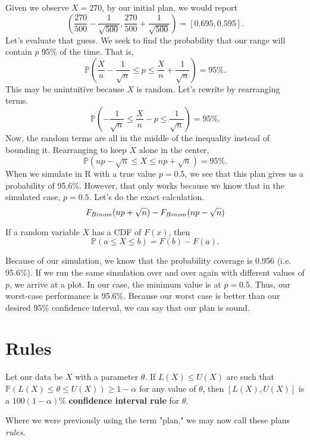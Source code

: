 \documentclass[titlepage, 12pt, leqno]{article}
\begin{document}
Given we observe $X=270$, by our initial plan, we would report
\[
\left(\frac{270}{500}-\frac{1}{\sqrt{500}}, \frac{270}{500} +
\frac{1}{\sqrt{500}}\right) = [0.695,0.595].
\]
Let's evaluate that guess. We seek to find the probability that our range will
contain $p$ 95\% of the time. That is,
\[
\mathbb{P}\left(
\frac{X}{n}-\frac{1}{\sqrt{n}} \le p \le \frac{X}{n} + \frac{1}{\sqrt{n}}
\right) = 95\%.
\]
This may be unintuitive because $X$ is random. Let's rewrite by rearranging
terms.
\[
\mathbb{P}\left(-\frac{1}{\sqrt{n}}\le \frac{X}{n}-p \le \frac{1}{\sqrt{n}}
    \right) = 95\%.
\]
Now, the random terms are all in the middle of the inequality instead of
bounding it. Rearranging to keep $X$ alone in the center,
\[
    \mathbb{P}(np-\sqrt{n} \le X \le np + \sqrt{n}) = 95\%.
\]
When we simulate in R with a true value $p=0.5$, we see that this plan gives us
a probability of 95.6\%. However, that only works because we know that in the
simulated case, $p=0.5$. Let's do the exact calculation.
\[
    F_{Binom}(np+\sqrt{n}) - F_{Binom}(np-\sqrt{n}) \\
\]
\begin{note}
    If a random variable $X$ has a CDF of $F(x)$, then
    \[
        \mathbb{P}(a\le X \le b) = F(b) - F(a).
    \]
\end{note}
Because of our simulation, we know that the probability coverage is 0.956 (i.e.
95.6\%). If we run the same simulation over and over again with different values
of $p$, we arrive at a plot. In our case, the minimum value is at $p=0.5$. Thus,
our worst-case performance is 95.6\%. Because our worst case is better than our
desired 95\% confidence interval, we can say that our plan is sound.

\pagebreak

\section{Rules}

\begin{definition}
Let our data be $X$ with a parameter $\theta$. If $L(X) \le U(X)$ are such that
$\mathbb{P}(L(X) \le \theta \le U(X)) \ge 1 - \alpha$ for any value of $\theta$,
then $[L(X),U(X)]$ is a $100(1-\alpha)\%$ \textbf{confidence interval rule} for
$\theta$.
\end{definition}
Where we were previously using the term "plan," we may now call these plans
\textit{rules}.
\end{document}
